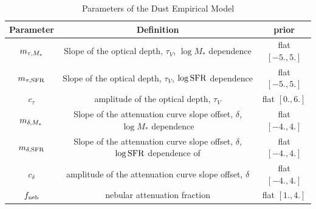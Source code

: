 \begin{table}
    \caption{Parameters of the Dust Empirical Model}
    \begin{center}
        \begin{tabular}{ccc} \toprule
            Parameter & Definition & prior\\[3pt] \hline\hline
            $m_{\tau,M_*}$ & Slope of the optical depth, $\tau_V$, $\log M_*$ dependence & flat $[-5., 5.]$\\
            $m_{\tau,{\rm SFR}}$ & Slope of the optical depth, $\tau_V$, $\log {\rm SFR}$ dependence & flat $[-5., 5.]$\\
            $c_{\tau}$ & amplitude of the optical depth, $\tau_V$ & flat $[0., 6.]$\\
            $m_{\delta,M_*}$ & Slope of the attenuation curve slope offset, $\delta$, $\log M_*$ dependence & flat $[-4., 4.]$\\
            $m_{\delta,{\rm SFR}}$ & Slope of the attenuation curve slope offset, $\delta$, $\log {\rm SFR}$ dependence of  & flat $[-4., 4.]$\\
            $c_{\delta}$ & amplitude of the attenuation curve slope offset, $\delta$ & flat $[-4., 4.]$\\
            $f_{\rm neb}$ & nebular attenuation fraction & flat $[1., 4.]$\\
            \hline
        \end{tabular} \label{tab:free_param}
    \end{center}
\end{table}

